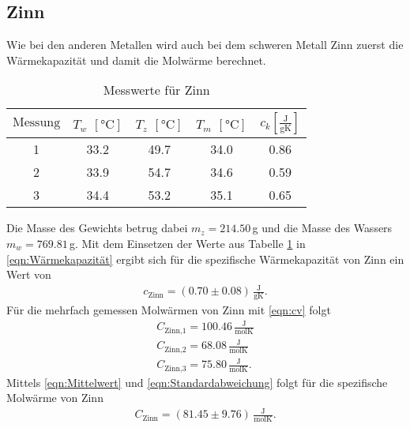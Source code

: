\subsection{Zinn}
Wie bei den anderen Metallen wird auch bei dem schweren Metall Zinn zuerst die Wärmekapazität
und damit die Molwärme berechnet.
\begin{table}
  \centering
  \caption{Messwerte für Zinn}
  \begin{tabular}{c c c c c}
    \toprule
    $\text{Messung}$ & $T_w$ $[\si{\degreeCelsius}]$ & $T_z$ $[\si{\degreeCelsius}]$& $T_m$ $[\si{\degreeCelsius}]$ & $c_k[\frac{\text{J}}{\text{gK}}]$\\
    \midrule
     1 & 33.2 & 49.7 & 34.0 & 0.86\\
     2 & 33.9 & 54.7 & 34.6 & 0.59\\
     3 & 34.4 & 53.2 & 35.1 & 0.65\\
    \bottomrule
  \end{tabular}
  \label{fig:zinn}
\end{table}
\newline
Die Masse des Gewichts betrug dabei $m_z=214.50$\,g und die Masse des Wassers $m_w=769.81$\,g.
Mit dem Einsetzen der Werte aus Tabelle \ref{fig:zinn} in \ref{eqn:Wärmekapazität} ergibt sich
für die spezifische Wärmekapazität von Zinn ein Wert von
\begin{align*}
  c_{\text{Zinn}} = (0.70\pm 0.08)\, \frac{\text{J}}{\text{gK}}.
\end{align*}
Für die mehrfach gemessen Molwärmen von Zinn mit \ref{eqn:cv} folgt
\begin{align*}
C_{\text{Zinn,1}} = 100.46\, \frac{\text{J}}{\text{molK}} \\
C_{\text{Zinn,2}} = 68.08\, \frac{\text{J}}{\text{molK}} \\
C_{\text{Zinn,3}} = 75.80\, \frac{\text{J}}{\text{molK}}.
\end{align*}
Mittels \ref{eqn:Mittelwert} und \ref{eqn:Standardabweichung} folgt für die spezifische
Molwärme von Zinn
\begin{align*}
  C_{\text{Zinn}} = (81.45\pm 9.76)\, \frac{\text{J}}{\text{molK}}.
\end{align*}
\newpage
